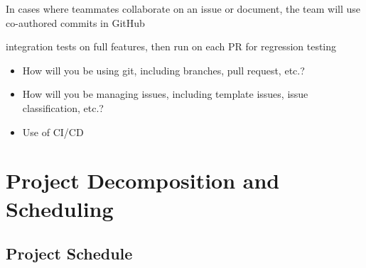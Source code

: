 \documentclass{article}
\begin{document}
In cases where teammates collaborate on an issue or document, the team will use co-authored commits in GitHub

integration tests on full features, then run on each PR for regression testing

\begin{itemize}
	\item How will you be using git, including branches, pull request, etc.?
	\item How will you be managing issues, including template issues, issue
	classification, etc.?
  \item Use of CI/CD
\end{itemize}

\section{Project Decomposition and Scheduling}

\subsection{Project Schedule}
\end{document}
